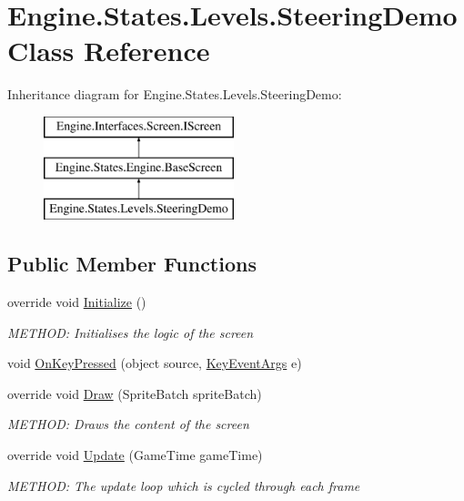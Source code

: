 \hypertarget{a00570}{}\section{Engine.\+States.\+Levels.\+Steering\+Demo Class Reference}
\label{a00570}
Inheritance diagram for Engine.\+States.\+Levels.\+Steering\+Demo\+:\begin{figure}[H]
\begin{center}
\leavevmode
\includegraphics[height=3.000000cm]{d8/da5/a00570}
\end{center}
\end{figure}
\subsection*{Public Member Functions}
\begin{DoxyCompactItemize}
\item 
override void \hyperlink{a00570_a3ae8b73b4618e8c2635d3b8c24d70bcb}{Initialize} ()
\begin{DoxyCompactList}\small\item\em M\+E\+T\+H\+OD\+: Initialises the logic of the screen \end{DoxyCompactList}\item 
void \hyperlink{a00570_addcf72bee8c2ebbf4a7170c21fb49275}{On\+Key\+Pressed} (object source, \hyperlink{a00362}{Key\+Event\+Args} e)
\item 
override void \hyperlink{a00570_a32c772a646fe78f26a4e9f83ae327156}{Draw} (Sprite\+Batch sprite\+Batch)
\begin{DoxyCompactList}\small\item\em M\+E\+T\+H\+OD\+: Draws the content of the screen \end{DoxyCompactList}\item 
override void \hyperlink{a00570_a4210cc45e9038a007132fbafde08fa71}{Update} (Game\+Time game\+Time)
\begin{DoxyCompactList}\small\item\em M\+E\+T\+H\+OD\+: The update loop which is cycled through each frame \end{DoxyCompactList}\end{DoxyCompactItemize}
